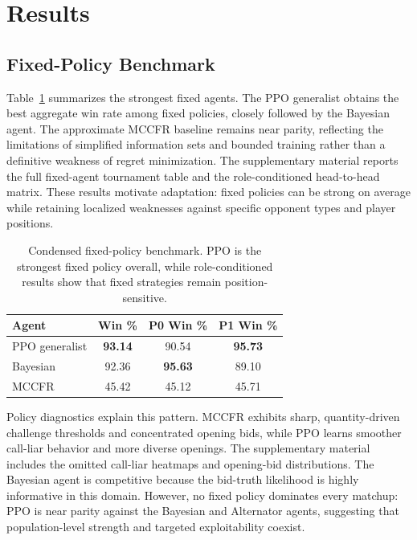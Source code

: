 \documentclass[letterpaper]{article} %
\begin{document}
\section{Results}
\subsection{Fixed-Policy Benchmark}
Table~\ref{tab:fixed_benchmark} summarizes the strongest fixed agents.
The PPO generalist obtains the best aggregate win rate among fixed policies, closely followed by the Bayesian agent. The approximate MCCFR baseline remains near parity, reflecting the limitations of simplified information sets and bounded training rather than a definitive weakness of regret minimization. The supplementary material reports the full fixed-agent tournament table and the role-conditioned head-to-head matrix. These results motivate adaptation: fixed policies can be strong on average while retaining localized weaknesses against specific opponent types and player positions.

\begin{table}[t]
\centering
\small
\begin{tabular}{lccc}
\toprule
Agent & Win \% & P0 Win \% & P1 Win \% \\
\midrule
PPO generalist & \textbf{93.14} & 90.54 & \textbf{95.73} \\
Bayesian       & 92.36 & \textbf{95.63} & 89.10 \\
MCCFR          & 45.42 & 45.12 & 45.71 \\
\bottomrule
\end{tabular}
\caption{Condensed fixed-policy benchmark. PPO is the strongest fixed policy overall, while role-conditioned results show that fixed strategies remain position-sensitive.}
\label{tab:fixed_benchmark}
\end{table}

Policy diagnostics explain this pattern. MCCFR exhibits sharp, quantity-driven challenge thresholds and concentrated opening bids, while PPO learns smoother call-liar behavior and more diverse openings. The supplementary material includes the omitted call-liar heatmaps and opening-bid distributions. The Bayesian agent is competitive because the bid-truth likelihood is highly informative in this domain. However, no fixed policy dominates every matchup: PPO is near parity against the Bayesian and Alternator agents, suggesting that population-level strength and targeted exploitability coexist.
\end{document}
